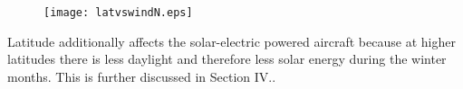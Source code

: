 \begin{figure}[H]
	\begin{center}
	\DIFdelbeginFL %
\DIFdelendFL \DIFaddbeginFL \texttt{[image: latvswindN.eps]}
    \DIFaddendFL \caption{\DIFdelbeginFL \textbf{}%
\DIFdelendFL \DIFaddbeginFL \textbf{}\DIFaddendFL }
	\label{f:latvswind}
	\end{center}
\end{figure}

Latitude additionally affects the solar-electric powered aircraft because at higher latitudes there is less daylight and therefore less solar energy during the winter months. This is further discussed in Section IV.\DIFdelbegin {}\DIFdelend \DIFaddbegin {}\DIFaddend .

